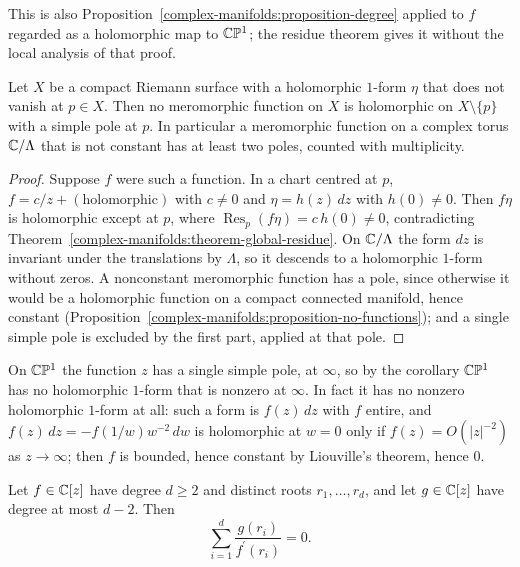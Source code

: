 This is also Proposition~\ref{complex-manifolds:proposition-degree} applied to $f$ regarded as a holomorphic map to $\mathbb{C}\mathbb{P}^1$; the residue theorem gives it without the local analysis of that proof.

\begin{corollary}\label{complex-manifolds:corollary-no-single-pole}
Let $X$ be a compact Riemann surface with a holomorphic $1$-form $\eta$ that does not vanish at $p \in X$. Then no meromorphic function on $X$ is holomorphic on $X \setminus \{p\}$ with a simple pole at $p$.
In particular a meromorphic function on a complex torus $\mathbb{C}/\Lambda$ that is not constant has at least two poles, counted with multiplicity.
\end{corollary}

\begin{proof}
Suppose $f$ were such a function. In a chart centred at $p$, $f = c/z + (\text{holomorphic})$ with $c \neq 0$ and $\eta = h(z)\,dz$ with $h(0) \neq 0$. Then $f\eta$ is holomorphic except at $p$, where
$\operatorname{Res}_p(f\eta) = c\,h(0) \neq 0$, contradicting Theorem~\ref{complex-manifolds:theorem-global-residue}. On $\mathbb{C}/\Lambda$ the form $dz$ is invariant under the translations by $\Lambda$, so it
descends to a holomorphic $1$-form without zeros. A nonconstant meromorphic function has a pole, since otherwise it would be a holomorphic function on a compact connected manifold, hence constant
(Proposition~\ref{complex-manifolds:proposition-no-functions}); and a single simple pole is excluded by the first part, applied at that pole.
\end{proof}

On $\mathbb{C}\mathbb{P}^1$ the function $z$ has a single simple pole, at $\infty$, so by the corollary $\mathbb{C}\mathbb{P}^1$ has no holomorphic $1$-form that is nonzero at $\infty$. In fact it has no nonzero holomorphic
$1$-form at all: such a form is $f(z)\,dz$ with $f$ entire, and $f(z)\,dz = -f(1/w)w^{-2}\,dw$ is holomorphic at $w = 0$ only if $f(z) = O(|z|^{-2})$ as $z \to \infty$; then $f$ is bounded, hence
constant by Liouville's theorem, hence $0$.

\begin{corollary}\label{complex-manifolds:corollary-euler-jacobi}
Let $f \in \mathbb{C}[z]$ have degree $d \geq 2$ and distinct roots $r_1, \ldots, r_d$, and let $g \in \mathbb{C}[z]$ have degree at most $d - 2$. Then
\[
\sum_{i=1}^d\frac{g(r_i)}{f^{\prime}(r_i)} = 0 .
\]
\end{corollary}

